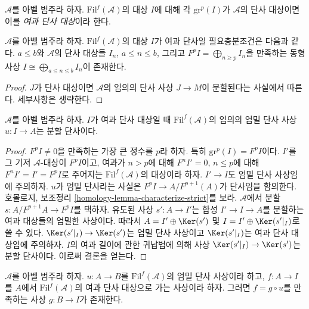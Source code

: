 \begin{definition}
\label{definition-filtered-complexes-notation}
$\mathcal{A}$를 아벨 범주라 하자. $\text{Fil}^f(\mathcal{A})$의 대상
$I$에 대해 각 $\text{gr}^p(I)$가 $\mathcal{A}$의 단사 대상이면
이를 {\it 여과 단사 대상}이라 한다.
\end{definition}

\begin{lemma}
\label{lemma-filtered-injective}
$\mathcal{A}$를 아벨 범주라 하자. $\text{Fil}^f(\mathcal{A})$의 대상
$I$가 여과 단사일 필요충분조건은 다음과 같다. $a \leq b$와
$\mathcal{A}$의 단사 대상들 $I_n$, $a \leq n \leq b$, 그리고
$F^pI = \bigoplus_{n \geq p} I_n$을 만족하는 동형사상
$I \cong \bigoplus_{a \leq n \leq b} I_n$이 존재한다.
\end{lemma}

\begin{proof}
$J$가 단사 대상이면 $\mathcal{A}$의 임의의 단사 사상 $J \to M$이
분할된다는 사실에서 따른다. 세부사항은 생략한다.
\end{proof}

\begin{lemma}
\label{lemma-split-strict-monomorphism}
$\mathcal{A}$를 아벨 범주라 하자. $I$가 여과 단사 대상일 때
$\text{Fil}^f(\mathcal{A})$의 임의의 엄밀 단사 사상
$u : I \to A$는 분할 단사이다.
\end{lemma}

\begin{proof}
$F^pI \not = 0$을 만족하는 가장 큰 정수를 $p$라 하자. 특히
$\text{gr}^p(I) = F^pI$이다. $I'$를 그 기저 $\mathcal{A}$-대상이
$F^pI$이고, 여과가 $n > p$에 대해 $F^nI' = 0$, $n \leq p$에 대해
$F^nI' = I' = F^pI$로 주어지는 $\text{Fil}^f(\mathcal{A})$의 대상이라
하자. $I' \to I$도 엄밀 단사 사상임에 주의하자.
$u$가 엄밀 단사라는 사실은 $F^pI \to A/F^{p + 1}(A)$가 단사임을
함의한다. 호몰로지, 보조정리
\ref{homology-lemma-characterize-strict}를 보라. $\mathcal{A}$에서 분할
$s : A/F^{p + 1}A \to F^pI$를 택하자. 유도된 사상
$s' : A \to I'$는 합성 $I' \to I \to A$를 분할하는 여과 대상들의
엄밀한 사상이다. 따라서 $A = I' \oplus \Ker(s')$ 및
$I = I' \oplus \Ker(s'|_I)$로 쓸 수 있다.
$\Ker(s'|_I) \to \Ker(s')$는 엄밀 단사 사상이고
$\Ker(s'|_I)$는 여과 단사 대상임에 주의하자. $I$의 여과 길이에 관한
귀납법에 의해 사상 $\Ker(s'|_I) \to \Ker(s')$는 분할 단사이다.
이로써 결론을 얻는다.
\end{proof}

\begin{lemma}
\label{lemma-injective-property-filtered-injective}
$\mathcal{A}$를 아벨 범주라 하자. $u : A \to B$를
$\text{Fil}^f(\mathcal{A})$의 엄밀 단사 사상이라 하고,
$f : A \to I$를 $A$에서 $\text{Fil}^f(\mathcal{A})$의 여과 단사
대상으로 가는 사상이라 하자. 그러면 $f = g \circ u$를 만족하는 사상
$g : B \to I$가 존재한다.
\end{lemma}


